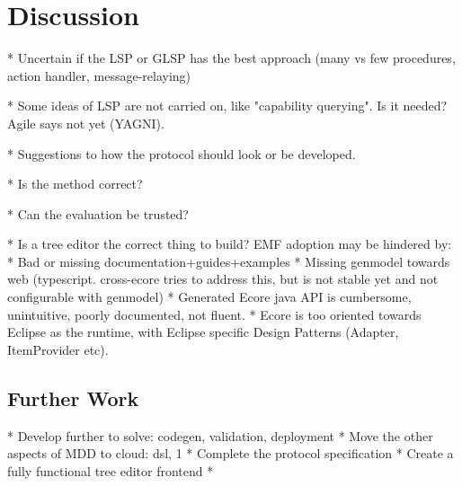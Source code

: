 \chapter{Discussion}\label{chap:discussion}


* Uncertain if the LSP or GLSP has the best approach (many vs few procedures, action handler, message-relaying)

* Some ideas of LSP are not carried on, like "capability querying". Is it needed? Agile says not yet (YAGNI).

* Suggestions to how the protocol should look or be developed.

* Is the method correct?

* Can the evaluation be trusted?

* Is a tree editor the correct thing to build? EMF adoption may be hindered by:
  * Bad or missing documentation+guides+examples
  * Missing genmodel towards web (typescript. cross-ecore tries to address this, but is not stable yet and not configurable with genmodel)
  * Generated Ecore java API is cumbersome, unintuitive, poorly documented, not fluent.
  * Ecore is too oriented towards Eclipse as the runtime, with Eclipse specific Design Patterns (Adapter, ItemProvider etc).

\section{Further Work}

* Develop further to solve: codegen, validation, deployment
* Move the other aspects of MDD to cloud: dsl, 1
* Complete the protocol specification
* Create a fully functional tree editor frontend
* 